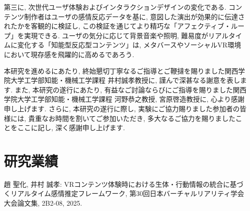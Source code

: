 \documentclass[book,paper=a4,fontsize=10pt,jafontscale=0.92]{jlreq}
\begin{document}
第三に, 次世代ユーザ体験およびインタラクションデザインの変化である. コンテンツ制作者はユーザの感情反応データを基に, 意図した演出が効果的に伝達されたかを客観的に検証し, この検証を通じてより精巧な「アフェクティブ・ループ」を実現できる. ユーザの気分に応じて背景音楽や照明, 難易度がリアルタイムに変化する「知能型反応型コンテンツ」は, メタバースやソーシャルVR環境において現存感を飛躍的に高めるであろう.


\acknowledgements

本研究を進めるにあたり, 終始懇切丁寧なるご指導とご鞭撻を賜りました関西学院大学工学部知能・機械工学課程 井村誠孝教授に, 謹んで深甚なる謝意を表します. 
また, 本研究の遂行にあたり, 有益なご討論ならびにご指導を賜りました関西学院大学工学部知能・機械工学課程 河野恭之教授, 宮原啓造教授に, 心より感謝申し上げます. さらに, 本研究の遂行に際し, 実験にご協力賜りました参加者の皆様には, 貴重なお時間を割いてご参加いただき, 多大なるご協力を賜りましたことをここに記し, 深く感謝申し上げます.








\chapter*{研究業績}
\noindent
趙 聖化, 井村 誠孝:
VRコンテンツ体験時における生体・行動情報の統合に基づくリアルタイム感情推定フレームワーク,
第30回日本バーチャルリアリティ学会大会論文集, 2B2-08, 2025.
\end{document}

